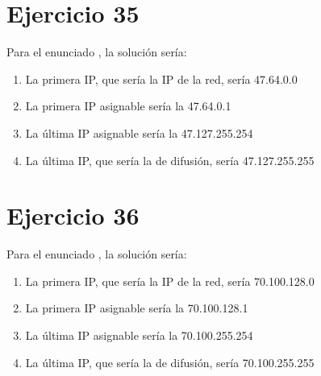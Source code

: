 \documentclass[letterpaper,10pt,spanish]{sphinxmanual}
\begin{document}
\section{Ejercicio 35}
\label{\detokenize{t2_integracion_elementos/ejercicios_subredes_ipv4/rangos_direcciones:id35}}
\sphinxAtStartPar
Para el enunciado , la solución sería:
\begin{enumerate}
%
\item {} 
\sphinxAtStartPar
La primera IP, que sería la IP de la red, sería 47.64.0.0

\item {} 
\sphinxAtStartPar
La primera IP asignable sería la 47.64.0.1

\item {} 
\sphinxAtStartPar
La última IP asignable sería la 47.127.255.254

\item {} 
\sphinxAtStartPar
La última IP, que sería la de difusión, sería 47.127.255.255

\end{enumerate}


\section{Ejercicio 36}
\label{\detokenize{t2_integracion_elementos/ejercicios_subredes_ipv4/rangos_direcciones:id36}}
\sphinxAtStartPar
Para el enunciado , la solución sería:
\begin{enumerate}
%
\item {} 
\sphinxAtStartPar
La primera IP, que sería la IP de la red, sería 70.100.128.0

\item {} 
\sphinxAtStartPar
La primera IP asignable sería la 70.100.128.1

\item {} 
\sphinxAtStartPar
La última IP asignable sería la 70.100.255.254

\item {} 
\sphinxAtStartPar
La última IP, que sería la de difusión, sería 70.100.255.255

\end{enumerate}
\end{document}
